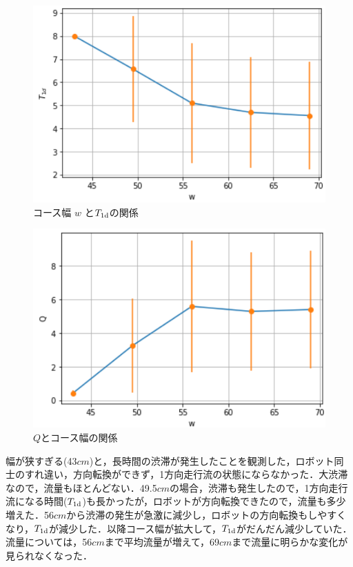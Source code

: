\vspace{-1mm}
\begin{figure}[!ht]
    \centering
    \includegraphics[width=1.0\linewidth]{diagram3a.jpg}
    \caption{コース幅 $w$ と$T_{\rm 1d}$の関係}
    \label{dia1}
\end{figure}
\vspace{-5mm}
\begin{figure}[!ht]
    \centering
    \includegraphics[width=1.0\linewidth]{diagram4a.jpg}
    \caption{$Q$とコース幅の関係}
    \label{dia2}
\end{figure}

幅が狭すぎる(43$cm$)と，長時間の渋滞が発生したことを観測した，ロボット同士のすれ違い，方向転換ができず，1方向走行流の状態にならなかった．大渋滞なので，流量もほとんどない．49.5$cm$の場合，渋滞も発生したので，1方向走行流になる時間($T_{\rm 1d}$)も長かったが，ロボットが方向転換できたので，流量も多少増えた．56$cm$から渋滞の発生が急激に減少し，ロボットの方向転換もしやすくなり，$T_{\rm 1d}$が減少した．以降コース幅が拡大して，$T_{\rm 1d}$がだんだん減少していた．流量については，56$cm$まで平均流量が増えて，69$cm$まで流量に明らかな変化が見られなくなった．

